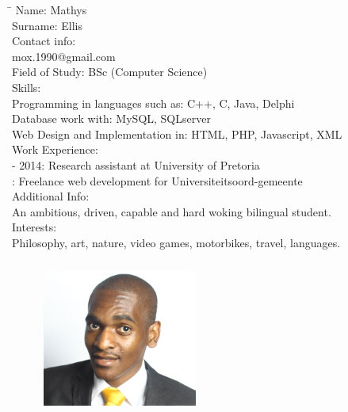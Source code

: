 \documentclass[12pt]{article}
\begin{document}
	\begin{tabbing}
		\hspace*{3.5cm}\=\hspace*{3cm} \kill
		Name:	\>	Mathys \\
		Surname:	\>	Ellis \\
		Contact info:	 \\
			\>	mox.1990@gmail.com \\
		Field of Study:	\> BSc (Computer Science) \\
		Skills:	\\
			\>	Programming in languages such as: C++, C, Java, Delphi \\
			\>	Database work with: MySQL, SQLserver \\
			\>	Web Design and Implementation in: HTML, PHP, Javascript, XML \\
		Work Experience: \\
			 - 2014: Research assistant at University of Pretoria \\
			: Freelance web development for Universiteitsoord-gemeente \\
		Additional Info: \\
		\> An ambitious, driven, capable and hard woking bilingual student. \\
		Interests: \\
		\> Philosophy, art, nature, video games, motorbikes, travel, languages. \\
	\end{tabbing}


	\newpage
	\begin{figure}[ht!]
		\centering
		\includegraphics[width=2in, height=2in]{./Pictures/MbulungoMusetsho.jpg}
	\end{figure}
	
\end{document}
